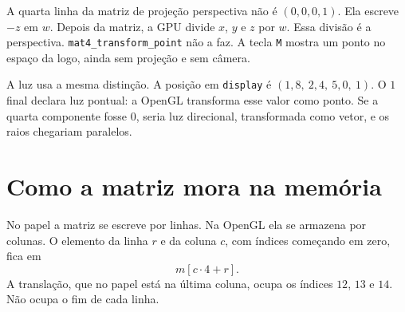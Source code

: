 \documentclass[11pt,a4paper]{article}
\newenvironment{figura}
  {\par\medskip\noindent\begin{minipage}{\linewidth}\centering}
  {\end{minipage}\par\medskip}
\newcommand{\fn}[1]{\texttt{\nobreak\hspace{0pt}#1}}
\begin{document}
A quarta linha da matriz de projeção perspectiva não é \((0, 0, 0, 1)\). Ela escreve \(-z\) em \(w\). Depois da matriz, a GPU divide \(x\), \(y\) e \(z\) por \(w\). Essa divisão é a perspectiva. \fn{mat4\_transform\_point} não a faz. A tecla \fn{M} mostra um ponto no espaço da logo, ainda sem projeção e sem câmera.

A luz usa a mesma distinção. A posição em \fn{display} é \((1{,}8,\ 2{,}4,\ 5{,}0,\ 1)\). O \(1\) final declara luz pontual: a OpenGL transforma esse valor como ponto. Se a quarta componente fosse \(0\), seria luz direcional, transformada como vetor, e os raios chegariam paralelos.

\section{Como a matriz mora na memória}
\label{sec:memoria}

No papel a matriz se escreve por linhas. Na OpenGL ela se armazena por colunas. O elemento da linha \(r\) e da coluna \(c\), com índices começando em zero, fica em
\begin{equation}
  m[c \cdot 4 + r].
  \label{eq:indice}
\end{equation}
A translação, que no papel está na última coluna, ocupa os índices \(12\), \(13\) e \(14\). Não ocupa o fim de cada linha.

\begin{figura}
\end{figura}
\end{document}
